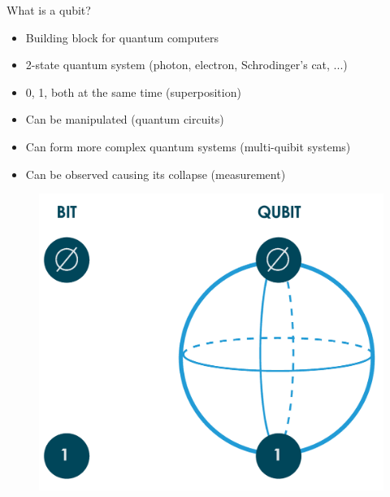 \begin{frame}{What is a qubit?}

		\begin{itemize}
			\item Building block for quantum computers
			\item 2-state quantum system (photon, electron, Schrodinger's cat, ...)
			\item 0, 1, both at the same time (superposition)
			\item Can be manipulated (quantum circuits)
			\item Can form more complex quantum systems (multi-quibit systems)
			\item Can be observed causing its collapse (measurement)
		\end{itemize}
		
		\begin{figure}[H]
          \centering
            \includegraphics[width=.4\linewidth]{qubit}
        \end{figure}
    
\end{frame}

